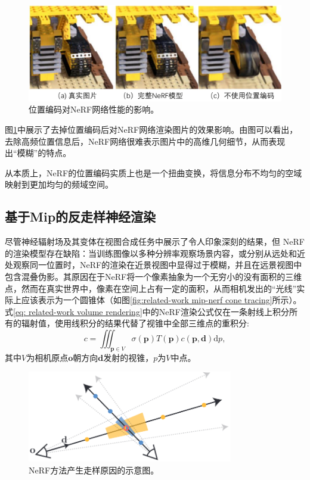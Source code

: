\begin{figure}[ht]
    \centering
    \includegraphics[width=\textwidth]{undergraduate-thesis/images/related-work/NeRF ablation-PE.pdf}
    \caption{位置编码对NeRF网络性能的影响。}
    \label{fig:related-work nerf-PE-ablation}
\end{figure}

图\ref{fig:related-work nerf-PE-ablation}中展示了去掉位置编码后对NeRF网络渲染图片的效果影响。由图可以看出，去除高频位置信息后，NeRF网络很难表示图片中的高维几何细节，从而表现出“模糊”的特点。

从本质上，NeRF的位置编码实质上也是一个扭曲变换，将信息分布不均匀的空域映射到更加均匀的频域空间。

\subsection{基于Mip的反走样神经渲染}
尽管神经辐射场\cite{mildenhall_nerf_2020}及其变体\cite{muller_instant_2022,martin-brualla_nerf_2021,zhang_nerf_2020}在视图合成任务中展示了令人印象深刻的结果，但 NeRF 的渲染模型存在缺陷：当训练图像以多种分辨率观察场景内容，或分别从远处和近处观察同一位置时，NeRF的渲染在近景视图中显得过于模糊，并且在远景视图中包含混叠伪影。其原因在于NeRF将一个像素抽象为一个无穷小的没有面积的三维点，然而在真实世界中，像素在空间上占有一定的面积，从而相机发出的“光线”实际上应该表示为一个圆锥体（如图\ref{fig:related-work mip-nerf cone tracing}所示）。式\ref{eq: related-work volume rendering}中的NeRF渲染公式仅在一条射线上积分所有的辐射值，使用线积分的结果代替了视锥中全部三维点的重积分:
\begin{equation}
    c = \iiint_{\mathbf{p}\in V}\sigma(\mathbf{p})T(\mathbf{p})c(\mathbf{p},\mathbf{d})\text{d}p,
\end{equation}
其中$V$为相机原点$\mathbf{o}$朝方向$\mathbf{d}$发射的视锥，$p$为$V$中点。

\begin{figure}[h]
    \centering
    \includegraphics[width=0.8\textwidth]{undergraduate-thesis/images/related-work/mipnerf-intersection.png}
    \caption{NeRF方法产生走样原因的示意图。}
    \label{fig:related-work mip-nerf intersection}
\end{figure}

